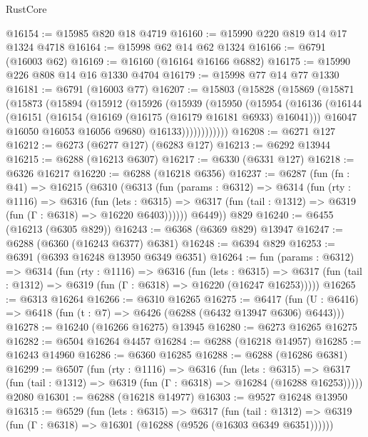 \begin{lexlean}{RustCore}
\begin{coremodule}
@16154 := @15985 @820 @18 @4719
@16160 := @15990 @220 @819 @14 @17 @1324 @4718
@16164 := @15998 @62 @14 @62 @1324
@16166 := @6791 (@16003 @62)
@16169 := @16160 (@16164 @16166 @6882)
@16175 := @15990 @226 @808 @14 @16 @1330 @4704
@16179 := @15998 @77 @14 @77 @1330
@16181 := @6791 (@16003 @77)
@16207 := @15803
    (@15828
      (@15869
        (@15871
          (@15873
            (@15894
              (@15912
                (@15926
                  (@15939
                    (@15950
                      (@15954
                        (@16136
                          (@16144
                            (@16151
                              (@16154 (@16169 (@16175 (@16179 @16181 @6933) @16041)))
                              @16047
                              @16050
                              @16053
                              @16056
                              @9680)
                            @16133))))))))))))
@16208 := @6271 @127
@16212 := @6273 (@6277 @127) (@6283 @127)
@16213 := @6292 @13944
@16215 := @6288 (@16213 @6307)
@16217 := @6330 (@6331 @127)
@16218 := @6326 @16217
@16220 := @6288 (@16218 @6356)
@16237 := @6287
    (fun (fn : @41) =>
    @16215
      (@6310
        (@6313
          (fun (params : @6312) =>
          @6314
            (fun (rty : @1116) =>
            @6316
              (fun (lets : @6315) =>
              @6317 (fun (tail : @1312) => @6319 (fun (Γ : @6318) => @16220 @6403))))))
        @6449))
    @829
@16240 := @6455 (@16213 (@6305 @829))
@16243 := @6368 (@6369 @829) @13947
@16247 := @6288 (@6360 (@16243 @6377) @6381)
@16248 := @6394 @829
@16253 := @6391 (@6393 @16248 @13950 @6349 @6351)
@16264 := fun (params : @6312) =>
  @6314
    (fun (rty : @1116) =>
    @6316
      (fun (lets : @6315) =>
      @6317 (fun (tail : @1312) => @6319 (fun (Γ : @6318) => @16220 (@16247 @16253)))))
@16265 := @6313 @16264
@16266 := @6310 @16265
@16275 := @6417
    (fun (U : @6416) => @6418 (fun (t : @7) => @6426 (@6288 (@6432 @13947 @6306) @6443)))
@16278 := @16240 (@16266 @16275) @13945
@16280 := @6273 @16265 @16275
@16282 := @6504 @16264 @4457
@16284 := @6288 (@16218 @14957)
@16285 := @16243 @14960
@16286 := @6360 @16285
@16288 := @6288 (@16286 @6381)
@16299 := @6507
    (fun (rty : @1116) =>
    @6316
      (fun (lets : @6315) =>
      @6317 (fun (tail : @1312) => @6319 (fun (Γ : @6318) => @16284 (@16288 @16253)))))
    @2080
@16301 := @6288 (@16218 @14977)
@16303 := @9527 @16248 @13950
@16315 := @6529
    (fun (lets : @6315) =>
    @6317
      (fun (tail : @1312) =>
      @6319 (fun (Γ : @6318) => @16301 (@16288 (@9526 (@16303 @6349 @6351))))))

\end{coremodule}
\end{lexlean}
